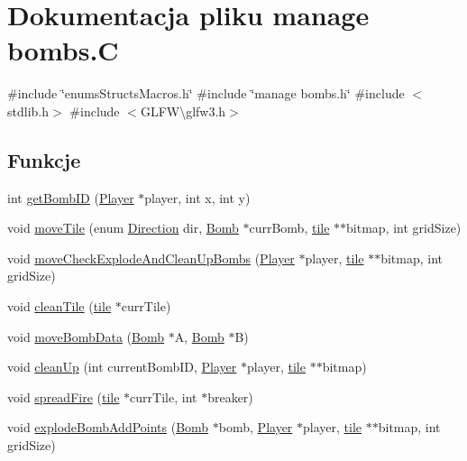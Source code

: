 \hypertarget{manage_01bombs_8_c}{}\section{Dokumentacja pliku manage bombs.\+C}
\label{manage_01bombs_8_c}
{\ttfamily \#include \char`\"{}enums\+Structs\+Macros.\+h\char`\"{}}\newline
{\ttfamily \#include \char`\"{}manage bombs.\+h\char`\"{}}\newline
{\ttfamily \#include $<$stdlib.\+h$>$}\newline
{\ttfamily \#include $<$G\+L\+F\+W\textbackslash{}glfw3.\+h$>$}\newline
\subsection*{Funkcje}
\begin{DoxyCompactItemize}
\item 
int \mbox{\hyperlink{manage_01bombs_8_c_af70d9453740a7975f3c98ba4e7509f68}{get\+Bomb\+ID}} (\mbox{\hyperlink{struct_player}{Player}} $\ast$player, int x, int y)
\item 
void \mbox{\hyperlink{manage_01bombs_8_c_aca788eb57bf358d97e52b9073b2e77b4}{move\+Tile}} (enum \mbox{\hyperlink{enums_structs_macros_8h_a224b9163917ac32fc95a60d8c1eec3aa}{Direction}} dir, \mbox{\hyperlink{struct_bomb}{Bomb}} $\ast$curr\+Bomb, \mbox{\hyperlink{structtile}{tile}} $\ast$$\ast$bitmap, int grid\+Size)
\item 
void \mbox{\hyperlink{manage_01bombs_8_c_adcc856d87c879a7c42cbfbca9f1743ac}{move\+Check\+Explode\+And\+Clean\+Up\+Bombs}} (\mbox{\hyperlink{struct_player}{Player}} $\ast$player, \mbox{\hyperlink{structtile}{tile}} $\ast$$\ast$bitmap, int grid\+Size)
\item 
void \mbox{\hyperlink{manage_01bombs_8_c_a5213a6ff696c7e7d6905b083246a6fe7}{clean\+Tile}} (\mbox{\hyperlink{structtile}{tile}} $\ast$curr\+Tile)
\item 
void \mbox{\hyperlink{manage_01bombs_8_c_a4681d0dec04b988bc375541bf030d779}{move\+Bomb\+Data}} (\mbox{\hyperlink{struct_bomb}{Bomb}} $\ast$A, \mbox{\hyperlink{struct_bomb}{Bomb}} $\ast$B)
\item 
void \mbox{\hyperlink{manage_01bombs_8_c_a1f413c301f0ada039af77930818a86e7}{clean\+Up}} (int current\+Bomb\+ID, \mbox{\hyperlink{struct_player}{Player}} $\ast$player, \mbox{\hyperlink{structtile}{tile}} $\ast$$\ast$bitmap)
\item 
void \mbox{\hyperlink{manage_01bombs_8_c_a2b0c8f6d639430b3aace67c461f3bc56}{spread\+Fire}} (\mbox{\hyperlink{structtile}{tile}} $\ast$curr\+Tile, int $\ast$breaker)
\item 
void \mbox{\hyperlink{manage_01bombs_8_c_a9bfcb5bfdd7a3ca96bcd86059a4933db}{explode\+Bomb\+Add\+Points}} (\mbox{\hyperlink{struct_bomb}{Bomb}} $\ast$bomb, \mbox{\hyperlink{struct_player}{Player}} $\ast$player, \mbox{\hyperlink{structtile}{tile}} $\ast$$\ast$bitmap, int grid\+Size)
\end{DoxyCompactItemize}



